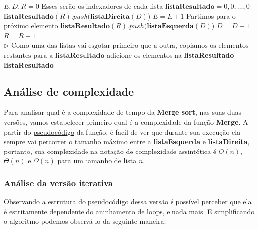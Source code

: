 \begin{algorithm}
	\label{algo:merge_aux_pseudo}
	\begin{algorithmic}[1]
		\Statex
		\State $E, D, R = 0$ \Comment Esses serão os indexadores de cada lista
		\State $\mathbf{listaResultado} = 0, 0,\ldots, 0$
		\State $\mathbf{listaResultado}(R).push(\mathbf{listaDireita}(D)$)
		\State $E = E + 1$ \Comment Partimos para o próximo elemento
		\Else
		\State $\mathbf{listaResultado}(R).push(\mathbf{listaEsquerda}(D)$)
		\State $D = D + 1$
		\EndIf
		\State $R = R + 1$
		\EndWhile
		\State $\rhd \text{ Como uma das listas vai esgotar primeiro que a outra, copiamos os elementos}$
		\State $\text{restantes para a }\mathbf{listaResultado}$
		\State adicione os elementos na \textbf{listaResultado}
		\EndWhile
		\State \Return \textbf{listaResultado}
		\EndFunction
	\end{algorithmic}
\end{algorithm}

\subsection{Análise de complexidade}
\label{anal:merge_sort}

Para analisar qual é a complexidade de tempo da \textbf{Merge sort}, nas suas duas versões, vamos estabelecer primeiro qual é a complexidade da função \textbf{Merge}. A partir do \href{algo:merge_aux_pseudo}{pseudocódigo} da função, é facil de ver que durante sua execução ela sempre vai percorrer o tamanho máximo entre a \textbf{listaEsquerda} e \textbf{listaDireita}, portanto, sua complexidade na notação de complexidade assintótica é $O(n)$, $\Theta(n)$ e $\Omega(n)$ para um tamanho de lista $n$.

\subsubsection{Análise da versão iterativa}

Observando a estrutura do \href{algo:merge_sort_it_pseudo}{pseudocódigo} dessa versão é possível perceber que ela é estritamente dependente do aninhamento de loops, e nada mais. E simplificando o algoritmo podemos observá-lo da seguinte maneira:

